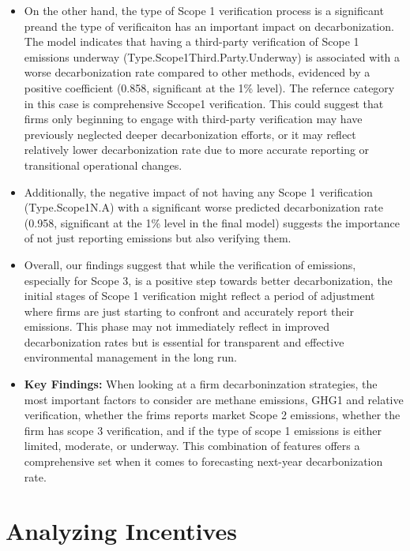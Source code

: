 \begin{itemize}
    \item On the other hand, the type of Scope 1 verification process is a significant preand the type of verificaiton has an important impact on decarbonization. The model indicates that having a third-party verification of Scope 1 emissions underway (Type.Scope1Third.Party.Underway) is associated with a worse decarbonization rate compared to other methods, evidenced by a positive coefficient (0.858, significant at the 1\% level). The refernce category in this case is comprehensive Sccope1 verification. This could suggest that firms only beginning to engage with third-party verification may have previously neglected deeper decarbonization efforts, or it may reflect relatively lower decarbonization rate due to more accurate reporting or transitional operational changes.
    
    \item Additionally, the negative impact of not having any Scope 1 verification (Type.Scope1N.A) with a significant worse predicted decarbonization rate (0.958, significant at the 1\% level in the final model) suggests the importance of not just reporting emissions but also verifying them.
    
    \item Overall, our findings suggest that while the verification of emissions, especially for Scope 3, is a positive step towards better decarbonization, the initial stages of Scope 1 verification might reflect a period of adjustment where firms are just starting to confront and accurately report their emissions. This phase may not immediately reflect in improved decarbonization rates but is essential for transparent and effective environmental management in the long run. 
    \item \textbf{Key Findings:} When looking at a firm decarboninzation strategies, the most important factors to consider are methane emissions, GHG1 and relative verification, whether the frims reports market Scope 2 emissions, whether the firm has scope 3 verification, and if the type of scope 1 emissions is either limited, moderate, or underway. This combination of features offers a comprehensive set when it comes to forecasting next-year decarbonization rate.
    
    
\end{itemize}


\section{Analyzing Incentives}

